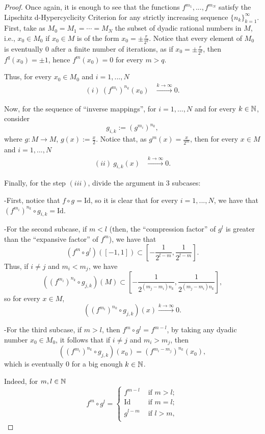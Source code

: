 \documentclass[11pt,reqno]{article}
\def\id{\text{Id}}
\def\NN{\Bbb N}
\begin{document}
\begin{proof}
Once again, it is enough to see that the functions $f^{m_1},...,f^{m_N}$ satisfy the Lipschitz d-Hypercyclicity Criterion for any strictly increasing sequence $\{n_k\}_{k=1}^\infty$.
First, take as $M_0=M_1= \cdots =M_N$ the subset of dyadic rational numbers in $M$, i.e., $x_0\in M_0$ if $x_0 \in M$ is of the form $x_0= \pm \frac{r}{2^q}$. Notice that every element of $M_0$ is eventually $0$ after a finite number of iterations, as if $x_0=\pm \frac{r}{2^q}$, then $f^q(x_0)=\pm 1$, hence $f^m(x_0)=0$ for every $m> q$.

     Thus, for every $x_0 \in M_0$ and $i=1,...,N$
\begin{align*}
 (i) \   (f^{m_i})^{n_k}(x_0) & \xrightarrow{k\to \infty } 0.
\end{align*}


Now, for the sequence of ``inverse mappings'', for $i=1,...,N$ and for every $k\in \NN$, consider
\[g_{i,k}:= (g^{m_i})^{n_k},\]
 where $g\colon M \to M $, $g(x):= \frac{x}{2}$. Notice that, as $g^m(x)=\frac{x}{2^m}$, then for every $x\in M$ and $i=1,...,N$
\begin{align*}
  (ii) \   g_{i,k}(x) & \xrightarrow{k\to \infty } 0.
\end{align*}

Finally, for the step $(iii)$, divide the argument in 3 subcases:


-First, notice that $f \circ g= \id$, so it is clear that for every $i=1,...,N$, we have that $(f^{m_i})^{n_k}\circ g_{i,k}= \id$.

-For the second subcase, if $m<l$ (then, the ``compression factor'' of $g^l$ is greater than the ``expansive factor'' of $f^m$), we have that 
\[(f^m \circ g^l)([-1,1])\subset [-\frac{1}{2^{l-m}},\frac{1}{2^{l-m}}].\]
Thus, if $i\neq j$ and $m_i < m_j$, we have
\[((f^{m_i})^{n_k} \circ g_{j,k})(M)\subset [-\frac{1}{2^{(m_j-m_i) n_k}},\frac{1}{2^{(m_j-m_i)n_k}}],\]
so for every $x\in M$,
\[((f^{m_i})^{n_k} \circ g_{j,k})(x) \xrightarrow{k\to \infty} 0. \]

-For the third subcase, if $m>l$, then $f^m\circ g^l=f^{m-l}$, by taking any dyadic number $x_0\in M_0$, it follows that if $i\neq j$ and $m_i > m_j$, then
\[((f^{m_i})^{n_k} \circ g_{j,k})(x_0)= (f^{m_i-m_j})^{n_k}(x_0),\]
which is eventually $0$ for a big enough $k\in \NN$.

 Indeed, for $m,l\in \NN$
  \begin{equation*}
    f^m\circ g^l= 
      \begin{cases}
        f^{m-l} & \text{ if } m>l;\\
      \id & \text{ if } m=l;\\
      g^{l-m} & \text{ if } l>m,\\
      \end{cases}
  \end{equation*}



\end{proof}
\end{document}
